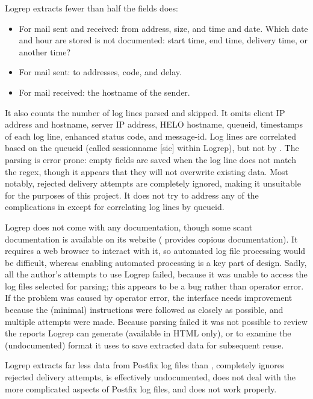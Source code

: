 Logrep extracts fewer than half the fields \parsername{} does:

\begin{itemize}

    \item For mail sent and received: from address, size, and time and
        date.  Which date and hour are stored is not documented: start
        time, end time, delivery time, or another time?

    \item For mail sent: to addresses,  code, and delay.

    \item For mail received: the hostname of the sender.

\end{itemize}

It also counts the number of log lines parsed and skipped.  It omits client
IP address and hostname, server IP address, HELO hostname, queueid,
timestamps of each log line, enhanced status code, and message-id\@.  Log
lines are correlated based on the queueid (called sessionname [sic] within
Logrep), but not by .  The parsing is error prone: empty
fields are saved when the log line does not match the regex, though it
appears that they will not overwrite existing data.  Most notably, rejected
delivery attempts are completely ignored, making it unsuitable for the
purposes of this project.  It does not try to address any of the
complications in  except for correlating log
lines by queueid.

Logrep does not come with any documentation, though some scant
documentation is available on its website (\parsername{} provides copious
documentation).  It requires a web browser to interact with it, so
automated log file processing would be difficult, whereas enabling
automated processing is a key part of \parsernames{} design.  Sadly, all
the author's attempts to use Logrep failed, because it was unable to access
the log files selected for parsing; this appears to be a bug rather than
operator error.  If the problem was caused by operator error, the interface
needs improvement because the (minimal) instructions were followed as
closely as possible, and multiple attempts were made.  Because parsing
failed it was not possible to review the reports Logrep can generate
(available in HTML only), or to examine the (undocumented) format it uses
to save extracted data for subsequent reuse.

Logrep extracts far less data from Postfix log files than \parsername{},
completely ignores rejected delivery attempts, is effectively undocumented,
does not deal with the more complicated aspects of Postfix log files, and
does not work properly.

